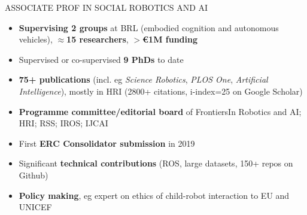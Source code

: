 \documentclass[xcolor=table]{beamer}
\makeatletter
\def\beamer@writeslidentry@miniframesoff{%
  \expandafter\beamer@ifempty\expandafter{\beamer@framestartpage}{}%
  {%
    \clearpage\beamer@notesactions%
  }
}
\newcommand*{\miniframesoff}{\let\beamer@writeslidentry=\beamer@writeslidentry@miniframesoff}
\makeatother
\begin{document}
\miniframesoff{}

\begin{frame}{ASSOCIATE PROF IN SOCIAL ROBOTICS AND AI}
    \begin{itemize}
        \item \textbf{Supervising 2 groups} at BRL (embodied cognition and autonomous
            vehicles), $\approx$\textbf{15 researchers}, \textbf{$>$€1M funding}
        \item Supervised or co-supervised \textbf{9 PhDs} to date
        \item \textbf{75+ publications} (incl. eg \emph{Science Robotics}, \emph{PLOS One},
            \emph{Artificial Intelligence}), mostly in HRI (2800+ citations, i-index=25 on Google Scholar)
        \item \textbf{Programme committee/editorial board} of FrontiersIn Robotics and
            AI; HRI; RSS; IROS; IJCAI
        \item First \textbf{ERC Consolidator submission} in 2019
        \item Significant \textbf{technical contributions} (ROS, large datasets, 150+
            repos on Github)
        \item \textbf{Policy making}, eg expert on ethics of child-robot interaction to EU and UNICEF
    \end{itemize}

\end{frame}






\end{document}
